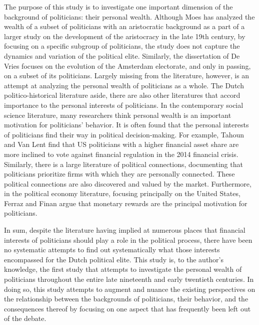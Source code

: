     The purpose of this study is to investigate one important dimension of the background of politicians: their personal wealth. Although Moes has analyzed the wealth of a subset of politicians with an aristocratic background as a part of a larger study on the development of the aristocracy in the late 19th century, by focusing on a specific subgroup of politicians, the study does not capture the dynamics and variation of the political elite. Similarly, the dissertation of De Vries focuses on the evolution of the Amsterdam electorate, and only in passing, on a subset of its politicians.\autocite{de1986electoraat} Largely missing from the literature, however, is an attempt at analyzing the personal wealth of politicians as a whole. The Dutch politico-historical literature aside, there are also other literatures that accord importance to the personal interests of politicians. In the contemporary social science literature, many researchers think personal wealth is an important motivation for politicians' behavior. %
    It is often found that the personal interests of politicians find their way in political decision-making. For example, Tahoun and Van Lent find that US politicians with a higher financial asset share are more inclined to vote against financial regulation in the 2014 financial crisis.\autocite{tahoun2019personal} Similarly, there is a large literature of political connections, documenting that politicians prioritize firms with which they are personally connected\autocite[see e.g.][]{duchin2012politics}. These political connections are also discovered and valued by the market.\autocite{fisman2001estimating} Furthermore, in the political economy literature, focusing principally on the United States, Ferraz and Finan argue that monetary rewards are the principal motivation for politicians.\autocite{ferraz2009motivating}
    
    In sum, despite the literature having implied at numerous places that financial interests of politicians should play a role in the political process, there have been no systematic attempts to find out systematically what those interests encompassed for the Dutch political elite. This study is, to the author's knowledge, the first study that attempts to investigate the personal wealth of politicians throughout the entire late nineteenth and early twentieth centuries. In doing so, this study attempts to augment and nuance the existing perspectives on the relationship between the backgrounds of politicians, their behavior, and the consequences thereof by focusing on one aspect that has frequently been left out of the debate. 
    
